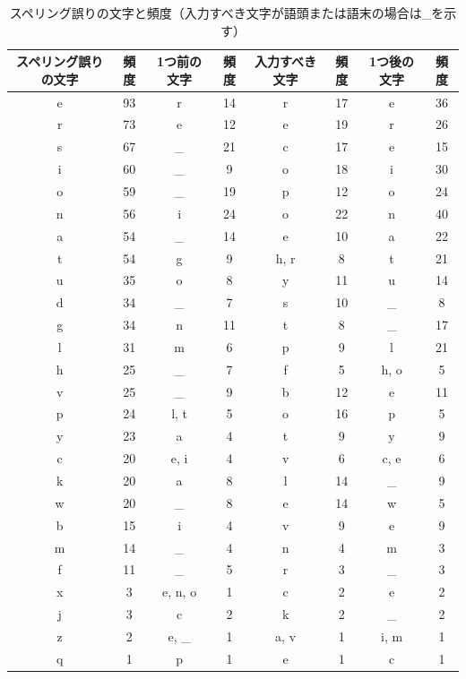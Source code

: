 \documentclass{jarticle}
\begin{document}
 \begin{table}[t]
  \small
  \centering
   \caption{スペリング誤りの文字と頻度（入力すべき文字が語頭または語末の場合は\_を示す）}
   \begin{tabular}{|c|c|c|c|c|c|c|c|} \hline
       	スペリング誤りの文字 & 頻度 & 1つ前の文字 & 頻度 & 入力すべき文字 & 頻度 & 1つ後の文字 & 頻度\\ \hline
	    e & 93 & r & 14 & r & 17 & e & 36 \\ \hline
	    r & 73 & e & 12 & e & 19 & r & 26 \\ \hline
	    s & 67 & \_ & 21 & c & 17 & e & 15\\ \hline
	    i & 60 & \_ & 9 & o & 18 & i & 30\\ \hline
	    o & 59 & \_ & 19 & p & 12 & o & 24\\ \hline
	    n & 56 & i & 24 & o & 22 & n & 40\\ \hline
	    a & 54 & \_ & 14 & e & 10 & a & 22\\ \hline
	    t & 54 & g & 9 & h, r & 8 & t & 21\\ \hline
	    u & 35 & o & 8 & y & 11 & u & 14\\ \hline
	    d & 34 & \_ & 7 & s & 10 & \_ & 8\\ \hline
	    g & 34 & n & 11 & t & 8 & \_ & 17\\ \hline
	    l & 31 & m & 6 & p & 9 & l & 21\\ \hline
	    h & 25 & \_ & 7 & f & 5 & h, o & 5\\ \hline
	    v & 25 & \_ & 9 & b & 12 & e & 11\\ \hline
	    p & 24 & l, t & 5 & o & 16 & p & 5\\ \hline
	    y & 23 & a & 4 & t & 9 & y & 9\\ \hline
	    c & 20 & e, i & 4 & v & 6 & c, e & 6\\ \hline
	    k & 20 & a & 8 & l & 14 & \_ & 9\\ \hline
	    w & 20 & \_ & 8 & e & 14 & w & 5\\ \hline
	    b & 15 & i & 4 & v & 9 & e & 9\\ \hline
	    m & 14 & \_ & 4 & n & 4 & m & 3\\ \hline
	    f & 11 & \_ & 5 & r & 3 & \_ & 3\\ \hline
	    x & 3 & e, n, o & 1 & c & 2 & e & 2\\ \hline
	    j & 3 & c & 2 & k & 2 & \_ & 2\\ \hline
	    z & 2 & e, \_ & 1 & a, v & 1 & i, m & 1\\ \hline
	    q & 1 & p & 1 & e & 1 & c & 1\\ \hline
   \end{tabular}
 \end{table}
\end{document}
